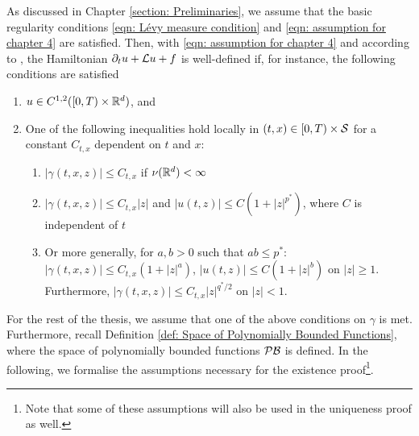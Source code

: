 As discussed in Chapter \ref{section: Preliminaries}, we assume that the basic regularity conditions \eqref{eqn: Lévy measure condition} and \eqref{eqn: assumption for chapter 4} are satisfied. Then, with \eqref{eqn: assumption for chapter 4} and according to \cite{seydel2010generalexistenceuniquenessviscosity}, the Hamiltonian $\partial_t u + \mathcal{L} u + f$ is well-defined if, for instance, the following conditions are satisfied
\begin{enumerate}
    \item $u \in C^{1,2}([0,T) \times \mathbb{R}^d)$, and
    \item One of the following inequalities hold locally in $(t,x) \in [0,T) \times \mathcal{S}$ for a constant $C_{t,x}$ dependent on $t$ and $x$:
    \begin{enumerate}[label=(\alph*)]
        \item $|\gamma(t,x,z)| \leq C_{t,x}$ if $\nu(\mathbb{R}^d) < \infty$
        \item $|\gamma(t,x,z)| \leq C_{t,x}|z|$ and $|u(t,z)| \leq C(1+|z|^{p^*})$, where $C$ is independent of $t$
        \item Or more generally, for $a,b>0$ such that $ab \leq p^*$: $|\gamma(t,x,z)| \leq C_{t,x}(1+|z|^a)$, $|u(t,z)| \leq C(1+|z|^b)$ on $|z|\geq1$. Furthermore, $|\gamma(t,x,z)| \leq C_{t,x} |z|^{q^*/2}$ on $|z|<1$. 
    \end{enumerate}
\end{enumerate}
For the rest of the thesis, we assume that one of the above conditions on $\gamma$ is met. Furthermore, recall Definition \ref{def: Space of Polynomially Bounded Functions}, where the space of polynomially bounded functions $\mathcal{PB}$ is defined. In the following, we formalise the assumptions necessary for the existence proof\footnote{Note that some of these assumptions will also be used in the uniqueness proof as well.}.

